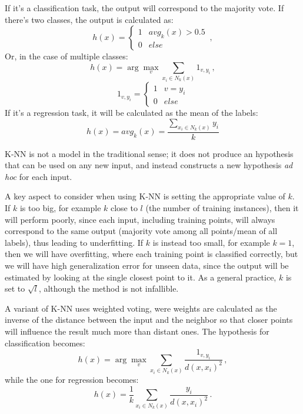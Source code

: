If it's a classification task, the output will correspond to the majority vote. If there's two classes, the output is calculated as:
\begin{equation*}
    h(x) = \begin{cases}
        1 & avg_k(x) > 0.5 \\
        0 & else
    \end{cases} \, ,
\end{equation*}
Or, in the case of multiple classes:
\begin{equation*}
    h(x) = \arg \max_v \sum_{x_i \in N_k(x)} 1_{v,y_i}  \, ,
\end{equation*}
\begin{equation*}
    1_{v,y_i} = \begin{cases}
        1 & v = y_i \\
        0 & else
    \end{cases}
\end{equation*}
If it's a regression task, it will be calculated as the mean of the labels:
\begin{equation*}
    h(x) = avg_k(x) = \frac{\sum_{x_i \in N_k(x)} y_i}{k}
\end{equation*}

K-NN is not a model in the traditional sense; it does not produce an hypothesis that can be used on any new input, and instead constructs a new hypothesis \textit{ad hoc} for each input.

A key aspect to consider when using K-NN is setting the appropriate value of $k$. If $k$ is too big, for example $k$ close to $l$ (the number of training instances), then it will perform poorly, since each input, including training points, will always correspond to the same output (majority vote among all points/mean of all labels), thus leading to underfitting. If $k$ is instead too small, for example $k = 1$, then we will have overfitting, where each training point is classified correctly, but we will have high generalization error for unseen data, since the output will be estimated by looking at the single closest point to it. As a general practice, $k$ is set to $\sqrt{l}$, although the method is not infallible.

A variant of K-NN uses weighted voting, were weights are calculated as the inverse of the distance between the input and the neighbor so that closer points will influence the result much more than distant ones. The hypothesis for classification becomes:
\begin{equation*}
    h(x) = \arg \max_v \sum_{x_i \in N_k(x)}  \dfrac{1_{v,y_i}}{d(x,x_i)^2} \, ,
\end{equation*}
while the one for regression becomes:
\begin{equation*}
    h(x) = \frac{1}{k}\sum_{x_i \in N_k(x)} \dfrac{y_i}{d(x,x_i)^2} \, .
\end{equation*}

